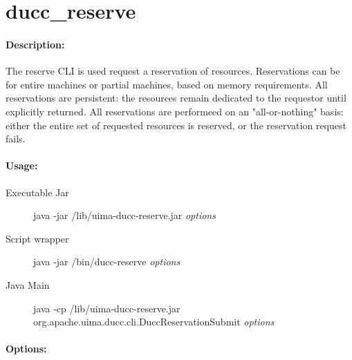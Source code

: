 \ifpdf
\else
{}
\fi
    \section{ducc\_reserve}

    \paragraph{Description:}
    The reserve CLI is used request a reservation of resources. Reservations can be for entire 
    machines or partial machines, based on memory requirements. All reservations are persistent: 
    the resources remain dedicated to the requestor until explicitly returned. All reservations are 
    performeed on an "all-or-nothing" basis: either the entire set of requested resources is reserved, 
    or the reservation request fails. 

    \paragraph{Usage:}
        \begin{description}
        \item[Executable Jar] java -jar \ducchome/lib/uima-ducc-reserve.jar {\em options}
        \item[Script wrapper] java -jar \ducchome/bin/ducc-reserve {\em options}
        \item[Java Main]      java -cp \ducchome/lib/uima-ducc-reserve.jar org.apache.uima.ducc.cli.DuccReservationSubmit {\em options}
        \end{description}

    \paragraph{Options:}
    
